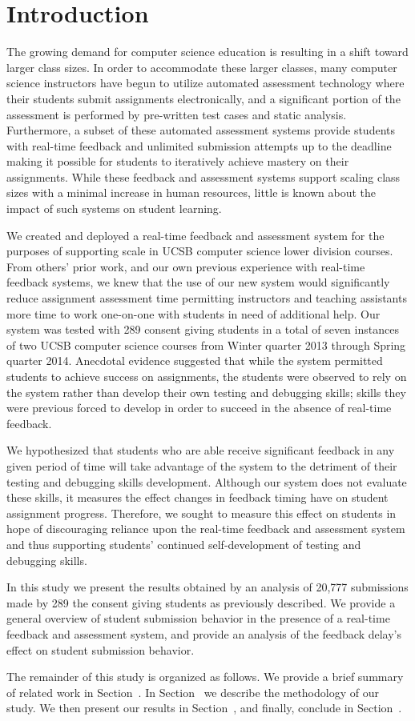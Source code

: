 \section{Introduction}
The growing demand for computer science education is resulting in a shift
toward larger class sizes. In order to accommodate these larger classes, many
computer science instructors have begun to utilize automated assessment
technology where their students submit assignments electronically, and a
significant portion of the assessment is performed by pre-written test cases
and static analysis. Furthermore, a subset of these automated assessment
systems provide students with real-time feedback and unlimited submission
attempts up to the deadline making it possible for students to iteratively
achieve mastery on their assignments. While these feedback and assessment
systems support scaling class sizes with a minimal increase in human resources,
little is known about the impact of such systems on student learning.

We created and deployed a real-time feedback and assessment system for the
purposes of supporting scale in UCSB computer science lower division
courses. From others' prior work, and our own previous experience with
real-time feedback systems, we knew that the use of our new system would
significantly reduce assignment assessment time permitting instructors and
teaching assistants more time to work one-on-one with students in need of
additional help. Our system was tested with 289 consent giving students in a
total of seven instances of two UCSB computer science courses from Winter
quarter 2013 through Spring quarter 2014. Anecdotal evidence suggested that
while the system permitted students to achieve success on assignments, the
students were observed to rely on the system rather than develop their own
testing and debugging skills; skills they were previous forced to develop in
order to succeed in the absence of real-time feedback.

We hypothesized that students who are able receive significant feedback in any
given period of time will take advantage of the system to the detriment of
their testing and debugging skills development. Although our system does not
evaluate these skills, it measures the effect changes in feedback timing have
on student assignment progress. Therefore, we sought to measure this effect on
students in hope of discouraging reliance upon the real-time feedback and
assessment system and thus supporting students' continued self-development of
testing and debugging skills.

In this study we present the results obtained by an analysis of 20,777
submissions made by 289 the consent giving students as previously described. We
provide a general overview of student submission behavior in the presence of a
real-time feedback and assessment system, and provide an analysis of the
feedback delay's effect on student submission behavior.

The remainder of this study is organized as follows. We provide a brief summary
of related work in Section~. In
Section~ we describe the methodology of our study. We
then present our results in Section~, and finally,
conclude in Section~.
